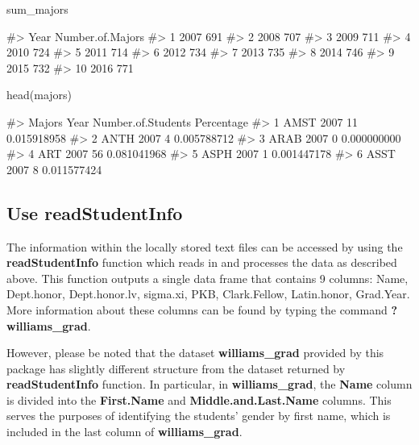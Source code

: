 \newpage

\begin{Schunk}
\begin{Sinput}
sum_majors
\end{Sinput}
\begin{Soutput}
#>    Year Number.of.Majors
#> 1  2007              691
#> 2  2008              707
#> 3  2009              711
#> 4  2010              724
#> 5  2011              714
#> 6  2012              734
#> 7  2013              735
#> 8  2014              746
#> 9  2015              732
#> 10 2016              771
\end{Soutput}
\end{Schunk}\begin{Schunk}
\begin{Sinput}
head(majors)
\end{Sinput}
\begin{Soutput}
#>   Majors Year Number.of.Students  Percentage
#> 1   AMST 2007                 11 0.015918958
#> 2   ANTH 2007                  4 0.005788712
#> 3   ARAB 2007                  0 0.000000000
#> 4    ART 2007                 56 0.081041968
#> 5   ASPH 2007                  1 0.001447178
#> 6   ASST 2007                  8 0.011577424
\end{Soutput}
\end{Schunk}

\subsection{Use readStudentInfo}\label{use-readstudentinfo}

The information within the locally stored text files can be accessed by
using the \textbf{readStudentInfo} function which reads in and processes
the data as described above. This function outputs a single data frame
that contains 9 columns: Name, Dept.honor, Dept.honor.lv, sigma.xi, PKB,
Clark.Fellow, Latin.honor, Grad.Year. More information about these
columns can be found by typing the command \textbf{?williams\_grad}.

However, please be noted that the dataset \textbf{williams\_grad}
provided by this package has slightly different structure from the
dataset returned by \textbf{readStudentInfo} function. In particular, in
\textbf{williams\_grad}, the \textbf{Name} column is divided into the
\textbf{First.Name} and \textbf{Middle.and.Last.Name} columns. This
serves the purposes of identifying the students' gender by first name,
which is included in the last column of \textbf{williams\_grad}.

